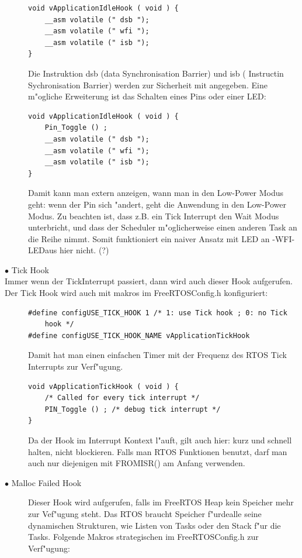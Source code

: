 \documentclass[a4paper, 8pt]{extarticle}
\begin{document}
\begin{multicols*}{3}
\begin{description}
						\begin{lstlisting}
void vApplicationIdleHook ( void ) {
	__asm volatile (" dsb ");
	__asm volatile (" wfi ");
	__asm volatile (" isb ");
}
						\end{lstlisting}
						Die Instruktion dsb (data Synchronisation Barrier) und isb ( Instructin Sychronisation Barrier) werden zur Sicherheit
						mit angegeben. 
						Eine m"ogliche Erweiterung ist das Schalten eines Pins oder einer LED:
						\begin{lstlisting}
void vApplicationIdleHook ( void ) {
	Pin_Toggle () ;
	__asm volatile (" dsb ");
	__asm volatile (" wfi ");
	__asm volatile (" isb ");
}
						\end{lstlisting}	
						Damit kann man extern anzeigen, wann man in den Low-Power Modus geht:
						wenn der Pin sich "andert, geht die Anwendung in den Low-Power Modus. Zu beachten ist,
						dass z.B. ein Tick Interrupt den Wait Modus unterbricht, und dass 
						der Scheduler m"oglicherweise einen anderen Task an die Reihe nimmt. 
						Somit funktioniert ein naiver Ansatz mit LED an -WFI-LEDaus hier nicht. (?)					
					\item[$\bullet$ Tick Hook]
					\item[Immer wenn der TickInterrupt passiert, dann wird auch dieser Hook aufgerufen. 
					Der Tick Hook wird auch mit makros im FreeRTOSConfig.h konfiguriert:] 
						\begin{lstlisting}
#define configUSE_TICK_HOOK 1 /* 1: use Tick hook ; 0: no Tick
	hook */
#define configUSE_TICK_HOOK_NAME vApplicationTickHook
						\end{lstlisting}
						Damit hat man einen einfachen Timer mit der Frequenz des RTOS Tick Interrupts zur Verf"ugung.
						\begin{lstlisting}
void vApplicationTickHook ( void ) {
	/* Called for every tick interrupt */
	PIN_Toggle () ; /* debug tick interrupt */
}
						\end{lstlisting} 
						Da der Hook im Interrupt Kontext l"auft, gilt auch hier: kurz und schnell halten, nicht blockieren. Falls man RTOS Funktionen
						benutzt, darf man auch nur diejenigen mit FROMISR() am Anfang verwenden.
					\item[$\bullet$ Malloc Failed Hook]
						Dieser Hook wird aufgerufen, falls im FreeRTOS Heap kein Speicher mehr zur Vef"ugung steht. Das RTOS braucht Speicher f"urdealle seine
						dynamischen Strukturen, wie Listen von Tasks oder den Stack f"ur die Tasks. Folgende Makros strategischen im FreeRTOSConfig.h zur
						Verf"ugung:

\end{description}
\end{multicols*}
\end{document}
